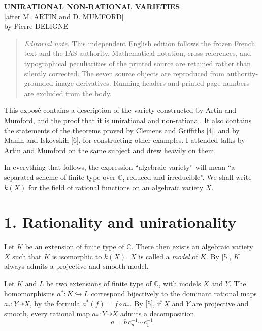 \documentclass[10pt]{article}
\newcommand{\CC}{\mathbb C}
\begin{document}
\begin{center}
{\Large\bfseries UNIRATIONAL NON-RATIONAL VARIETIES}\\[0.35em]
{\large [after M. ARTIN and D. MUMFORD]}\\[0.35em]
{\large by Pierre DELIGNE}
\end{center}

\begin{quote}\small
\textit{Editorial note.} This independent English edition follows the frozen
French text and the IAS authority. Mathematical notation, cross-references,
and typographical peculiarities of the printed source are retained rather than
silently corrected. The seven source objects are reproduced from
authority-grounded image derivatives. Running headers and printed page numbers
are excluded from the body.
\end{quote}

This exposé contains a description of the variety constructed by Artin and
Mumford, and the proof that it is unirational and non-rational. It also contains
the statements of the theorems proved by Clemens and Griffiths [4], and by Manin
and Iskovskih [6], for constructing other examples. I attended talks by Artin
and Mumford on the same subject and drew heavily on them.

In everything that follows, the expression ``algebraic variety'' will mean ``a
separated scheme of finite type over \(\CC\), reduced and irreducible''. We
shall write \(k(X)\) for the field of rational functions on an algebraic
variety \(X\).

\section*{1. Rationality and unirationality}

Let \(K\) be an extension of finite type of \(\CC\). There then exists an
algebraic variety \(X\) such that \(K\) is isomorphic to \(k(X)\). \(X\) is
called a \emph{model} of \(K\). By [5], \(K\) always admits a projective and
smooth model.

Let \(K\) and \(L\) be two extensions of finite type of \(\CC\), with models
\(X\) and \(Y\). The homomorphisms \(a^*:K\hookrightarrow L\) correspond
bijectively to the dominant rational maps \(a_*:Y\dashrightarrow X\), by the
formula \(a^*(f)=f\circ a_*\). By [5], if \(X\) and \(Y\) are projective and
smooth, every rational map \(a_*:Y\dashrightarrow X\) admits a decomposition
\[
  a=b\,c_n^{-1}\cdots c_1^{-1}
\]
\end{document}
